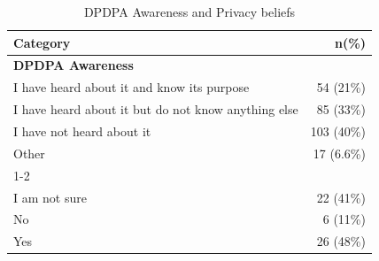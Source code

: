 \begin{table}[htbp]
    \centering
        \begin{tabular}{lr}
            \toprule
            \textbf{Category} & \textbf{n(\%)} \\
            \midrule
            \multicolumn{2}{l}{\textbf{DPDPA Awareness}} \\
            I have heard about it and know its purpose & 54 (21\%) \\
            I have heard about it but do not know anything else & 85 (33\%) \\
            I have not heard about it & 103 (40\%) \\
            Other & 17 (6.6\%) \\
            \cmidrule(l){1-2}
            \multicolumn{2}{l}{\textbf{DPDPA Privacy}} \\
            I am not sure & 22 (41\%) \\
            No & 6 (11\%) \\
            Yes & 26 (48\%) \\
            \bottomrule
        \end{tabular}
    \caption{DPDPA Awareness and Privacy beliefs}
    \label{tab:dpdpa-awareness}
\end{table}


